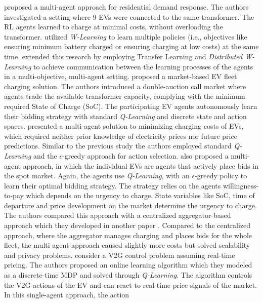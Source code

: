 \documentclass[12pt, article]{article}
\begin{document}
\textcite{dusparic13_multi} proposed a multi-agent approach for residential demand
response. The authors investigated a setting where 9  EVs were connected to the
same transformer. The RL agents learned to charge at minimal costs, without
overloading the transformer. \textcite{dusparic13_multi} utilized \emph{W-Learning} to
learn multiple policies (i.e., objectives like ensuring minimum battery charged
or ensuring charging at low costs) at the same time.
\textcite{taylor14_accel_learn_trans_learn} extended this research by employing
Transfer Learning and \emph{Distributed W-Learning} to achieve communication between
the learning processes of the agents in a multi-objective, multi-agent setting.
\textcite{dauer13_market_based_ev_charg_coord} proposed a market-based EV fleet
charging solution. The authors introduced a double-auction call market where
agents trade the available transformer capacity, complying with the minimum
required State of Charge (SoC). The participating EV agents autonomously learn
their bidding strategy with standard \emph{Q-Learning} and discrete state and action
spaces. \textcite{giorgio13_elect_vehic} presented a multi-agent solution to
minimizing charging costs of EVs, which required neither prior knowledge of
electricity prices nor future price predictions. Similar to the previous study
the authors employed standard \emph{Q-Learning} and the \(\epsilon\)-greedy approach for
action selection. \textcite{vaya14_optim} also proposed a multi-agent approach,
in which the individual EVs are agents that actively place bids in the
spot market. Again, the agents use \emph{Q-Learning}, with an \(\epsilon\)-greedy policy
to learn their optimal bidding strategy. The strategy relies on the agents
willingness-to-pay which depends on the urgency to charge. State variables like
SoC, time of departure and price development on the market determine the urgency
to charge. The authors compared this approach with a centralized
aggregator-based approach which they developed in another paper
\parencite{vaya15_optim_biddin_strat_plug_in}. Compared to the centralized
approach, where the aggregator manages charging and places bids for the whole
fleet, the multi-agent approach caused slightly more costs but solved scalability
and privacy problems. \textcite{shi11_real} consider a V2G control problem
assuming real-time pricing. The authors proposed an online learning algorithm
which they modeled as a discrete-time MDP and solved through
\emph{Q-Learning}. The algorithm controls the V2G actions of the EV and can react to
real-time price signals of the market. In this single-agent approach, the action
\end{document}
